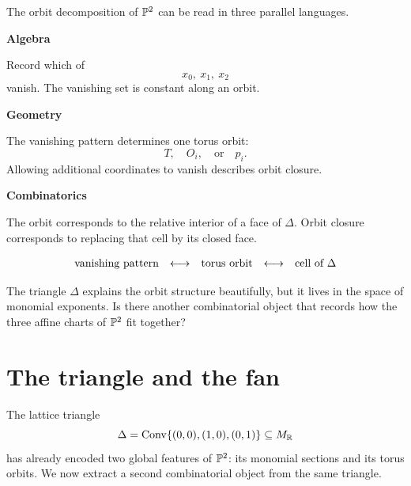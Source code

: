 \begin{threedictionaries}
The orbit decomposition of \(\mathbb{P}^2\) can be read in three parallel
languages.

\medskip

\noindent
\begin{minipage}[t]{0.30\linewidth}
\centering
\textbf{Algebra}\par
\smallskip
Record which of
\[
x_0,\ x_1,\ x_2
\]
vanish. The vanishing set is constant along an orbit.
\end{minipage}
\hfill
\begin{minipage}[t]{0.30\linewidth}
\centering
\textbf{Geometry}\par
\smallskip
The vanishing pattern determines one torus orbit:
\[
T,\quad O_i,\quad\text{or}\quad p_i.
\]
Allowing additional coordinates to vanish describes orbit closure.
\end{minipage}
\hfill
\begin{minipage}[t]{0.30\linewidth}
\centering
\textbf{Combinatorics}\par
\smallskip
The orbit corresponds to the relative interior of a face of
\(\Delta\). Orbit closure corresponds to replacing that cell by its
closed face.
\end{minipage}

\medskip

\[
\begin{array}{c@{\quad\longleftrightarrow\quad}c
              @{\quad\longleftrightarrow\quad}c}
\text{vanishing pattern}
&
\text{torus orbit}
&
\text{cell of }\Delta
\end{array}
\]
\end{threedictionaries}

\begin{guidingquestion}
The triangle \(\Delta\) explains the orbit structure beautifully, but
it lives in the space of monomial exponents. Is there another
combinatorial object that records how the three affine charts of
\(\mathbb{P}^2\) fit together?
\end{guidingquestion}


\section{The triangle and the fan}
\label{sec:p2-triangle-fan}

The lattice triangle
\[
\Delta=\operatorname{Conv}\{(0,0),(1,0),(0,1)\}\subseteq M_{\mathbb{R}}
\]
has already encoded two global features of \(\mathbb{P}^2\): its monomial
sections and its torus orbits. We now extract a second combinatorial
object from the same triangle.

